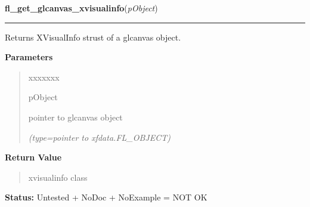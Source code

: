\hspace{.8\funcindent}\begin{boxedminipage}{\funcwidth}

    \raggedright \textbf{fl\_get\_glcanvas\_xvisualinfo}(\textit{pObject})

    \vspace{-1.5ex}

    \rule{\textwidth}{0.5\fboxrule}
\setlength{\parskip}{2ex}
    Returns XVisualInfo strust of a glcanvas object.

\setlength{\parskip}{1ex}
      \textbf{Parameters}
      \vspace{-1ex}

      \begin{quote}
        \begin{Ventry}{xxxxxxx}

          \item[pObject]

          pointer to glcanvas object

            {\it (type=pointer to xfdata.FL\_OBJECT)}

        \end{Ventry}

      \end{quote}

      \textbf{Return Value}
    \vspace{-1ex}

      \begin{quote}
      xvisualinfo class

      \end{quote}

\textbf{Status:} Untested + NoDoc + NoExample = NOT OK



    \end{boxedminipage}

    \label{xformslib:library:fl_get_glcanvas_context}

    \vspace{0.5ex}

